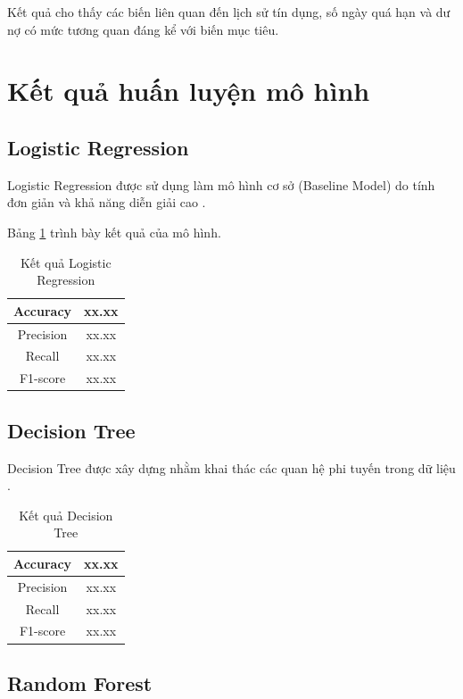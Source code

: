 Kết quả cho thấy các biến liên quan đến lịch sử tín dụng, số ngày quá hạn và dư nợ có mức tương quan đáng kể với biến mục tiêu.

\section{Kết quả huấn luyện mô hình}

\subsection{Logistic Regression}

Logistic Regression được sử dụng làm mô hình cơ sở (Baseline Model) do tính đơn giản và khả năng diễn giải cao \cite{hosmer2013applied}.

Bảng \ref{tab:lr_result} trình bày kết quả của mô hình.

\begin{table}[H]
\centering
\caption{Kết quả Logistic Regression}
\label{tab:lr_result}
\begin{tabular}{|c|c|}
\hline
Accuracy & xx.xx \\
\hline
Precision & xx.xx \\
\hline
Recall & xx.xx \\
\hline
F1-score & xx.xx \\
\hline
\end{tabular}
\end{table}

\subsection{Decision Tree}

Decision Tree được xây dựng nhằm khai thác các quan hệ phi tuyến trong dữ liệu \cite{quinlan1986induction}.

\begin{table}[H]
\centering
\caption{Kết quả Decision Tree}
\begin{tabular}{|c|c|}
\hline
Accuracy & xx.xx \\
\hline
Precision & xx.xx \\
\hline
Recall & xx.xx \\
\hline
F1-score & xx.xx \\
\hline
\end{tabular}
\end{table}

\subsection{Random Forest}

